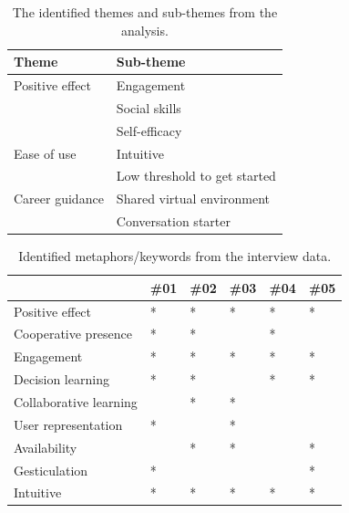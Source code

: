 \begin{table}[H]
      \centering
        \begin{tabular}{ll}
        \toprule
        Theme & Sub-theme \\
        \midrule
       Positive effect & Engagement\\
        & Social skills \\\vspace{0.2cm}
        & Self-efficacy \\
        Ease of use & Intuitive\\\vspace{0.2cm}
        & Low threshold to get started \\
        Career guidance & Shared virtual environment\\\vspace{0.2cm}
        & Conversation starter \\
        \bottomrule
        \end{tabular}
        \caption{The identified themes and sub-themes from the analysis.}
        \label{table:phase3ThemeAnalysis}
\end{table}






\begin{table}[H]
\centering
\begin{tabular}{l|lllll}
                        & \#01      & \#02     &\#03    &\#04 & \#05\\ \hline 
Positive effect         & *          &*          & *        & *     &*\\ 
Cooperative presence    & *          & *         &          & *     &\\ 
Engagement              & *          & *         & *        & *     &*\\ 
Decision learning       & *          & *         &          & *     &*\\ 
Collaborative learning  &            & *         & *        &       &\\ 
User representation     & *          &           & *        &       &\\ 
Availability            &            & *         & *        &       &*\\ 
Gesticulation           & *          &           &          &       &*\\ 
Intuitive               & *          & *         & *        &*      &*\\


\end{tabular}
\caption{Identified metaphors/keywords from the interview data.}
\label{table:phase3MethaphorsAnalysis}
\end{table}


